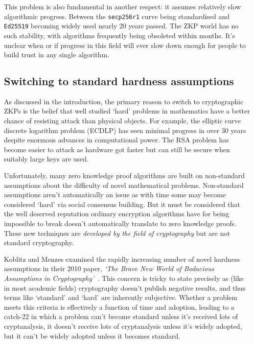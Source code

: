 \documentclass{article}
\begin{document}
This problem is also fundamental in another respect: it assumes relatively slow algorithmic progress. Between
the \texttt{secp256r1} curve being standardised and \texttt{Ed25519} becoming widely used nearly 20 years
passed. The ZKP world has no such stability, with algorithms frequently being obsoleted within months. It's
unclear when or if progress in this field will ever slow down enough for people to build trust in any single
algorithm.

\subsection{Switching to standard hardness assumptions}\label{subsec:switching-to-standard-hardness-assumptions}

As discussed in the introduction, the primary reason to switch to cryptographic ZKPs is the belief that well
studied `hard' problems in mathematics have a better chance of resisting attack than physical objects. For
example, the elliptic curve discrete logarithm problem (ECDLP) has seen minimal progress in over 30 years
despite enormous advances in computational power. The RSA problem has become easier to attack as hardware
got faster but can still be secure when suitably large keys are used.

Unfortunately, many zero knowledge proof algorithms are built on non-standard assumptions about the difficulty of
novel mathematical problems. Non-standard assumptions aren't automatically an issue as with time some may become
considered `hard' via social consensus building. But it must be considered that the well deserved reputation
ordinary encryption algorithms have for being impossible to break doesn't automatically translate to zero knowledge
proofs. These new techniques are \emph{developed by the field of cryptography} but are not standard cryptography.

Koblitz and Menzes examined the rapidly increasing number of novel hardness assumptions in their 2010 paper, \emph{`The
Brave New World of Bodacious Assumptions in Cryptography'}~\cite{koblitz2010brave}. This concern is tricky to state
precisely as (like in most academic fields) cryptography doesn't publish negative results, and thus terms like
`standard' and `hard' are inherently subjective. Whether a problem meets this criteria is effectively a function of
time and adoption, leading to a catch-22 in which a problem can't become standard unless it's received lots of
cryptanalysis, it doesn't receive lots of cryptanalysis unless it's widely adopted, but it can't be widely adopted
unless it becomes standard.
\end{document}
